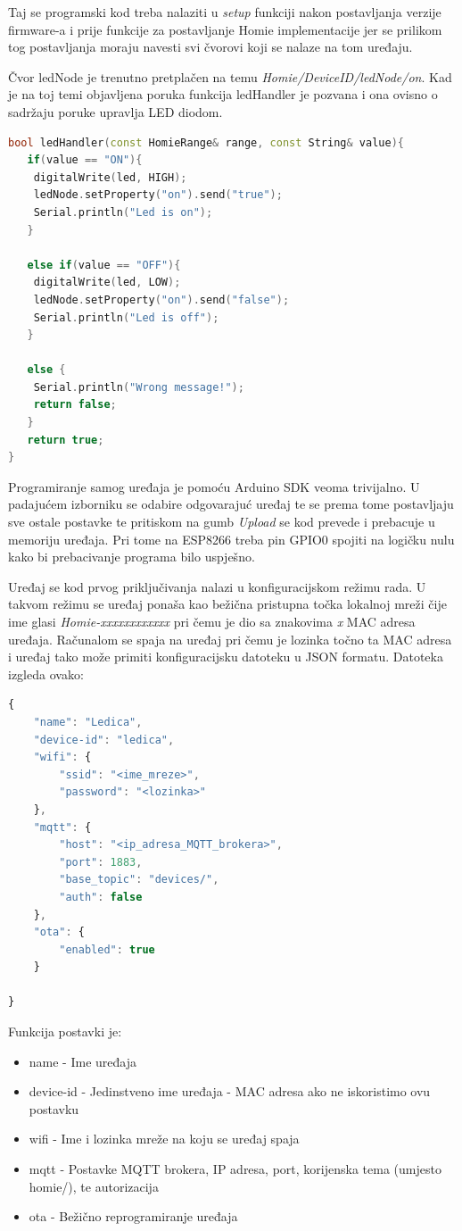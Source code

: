 \documentclass[times, utf8, zavrsni]{fer}
\begin{document}
Taj se programski kod treba nalaziti u \textit{setup} funkciji nakon postavljanja verzije firmware-a i prije funkcije za postavljanje Homie implementacije jer se prilikom tog postavljanja moraju navesti svi čvorovi koji se nalaze na tom uređaju.

Čvor ledNode je trenutno pretplačen na temu \textit{Homie/DeviceID/ledNode/on}.
Kad je na toj temi objavljena poruka funkcija ledHandler je pozvana i ona ovisno o sadržaju poruke upravlja LED diodom.
\begin{lstlisting}[language=C++]
bool ledHandler(const HomieRange& range, const String& value){
   if(value == "ON"){
    digitalWrite(led, HIGH);
    ledNode.setProperty("on").send("true");
    Serial.println("Led is on");
   }

   else if(value == "OFF"){
    digitalWrite(led, LOW);
    ledNode.setProperty("on").send("false");
    Serial.println("Led is off");
   }

   else {
    Serial.println("Wrong message!");
    return false;
   }
   return true;
}
\end{lstlisting}

Programiranje samog uređaja je pomoću Arduino SDK veoma trivijalno.
U padajućem izborniku se odabire odgovarajuć uređaj te se prema tome postavljaju sve ostale postavke te pritiskom na gumb \textit{Upload} se kod prevede i prebacuje u memoriju uređaja.
Pri tome na ESP8266 treba pin GPIO0 spojiti na logičku nulu kako bi prebacivanje programa bilo uspješno.

Uređaj se kod prvog priključivanja nalazi u konfiguracijskom režimu rada.
U takvom režimu se uređaj ponaša kao bežična pristupna točka lokalnoj mreži čije ime glasi \textit{Homie-xxxxxxxxxxxx} pri čemu je dio sa znakovima \textit{x} MAC adresa uređaja.
Računalom se spaja na uređaj pri čemu je lozinka točno ta MAC adresa i uređaj tako može primiti konfiguracijsku datoteku u JSON formatu.
Datoteka izgleda ovako:
\begin{lstlisting}[language=JavaScript]
{
    "name": "Ledica",
    "device-id": "ledica",
    "wifi": {
        "ssid": "<ime_mreze>",
        "password": "<lozinka>"
    },
    "mqtt": {
        "host": "<ip_adresa_MQTT_brokera>",
        "port": 1883,
        "base_topic": "devices/",
        "auth": false
    },
    "ota": {
        "enabled": true
    }

}
\end{lstlisting}
Funkcija postavki je:
\begin{itemize}
    \item name - Ime uređaja
    \item device-id - Jedinstveno ime uređaja - MAC adresa ako ne iskoristimo ovu postavku
    \item wifi - Ime i lozinka mreže na koju se uređaj spaja
    \item mqtt - Postavke MQTT brokera, IP adresa, port, korijenska tema (umjesto homie/), te autorizacija
    \item ota - Bežično reprogramiranje uređaja
\end{itemize}
\end{document}
